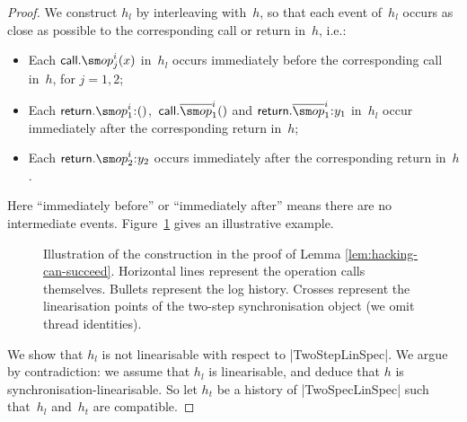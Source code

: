 \begin{proof}
We construct $h_l$ by interleaving with~$h$, so that each event of~$h_l$
occurs as close as possible to the corresponding call or return in~$h$, i.e.:
%
\begin{itemize}
\item Each $\call.\op_j^{i}(x)$ in~$h_l$ occurs immediately before the
  corresponding call in~$h$, for $j = 1,2$;

\item Each $\return.\op_1^i \:: ()$,\, $\call.\overline{\op}_1^i()$ and
  $\return.\overline{\op}_1^i \:: y_1$ in~$h_l$ occur immediately after the
  corresponding return in~$h$;

\item Each $\return.\op_2^i \:: y_2$ occurs immediately after the
  corresponding return in~$h$.
\end{itemize}
%
Here ``immediately before'' or ``immediately after'' means there are no
intermediate events.  Figure~\ref{fig:hacking-can-succeed} gives an
illustrative example. 


\begin{figure}[tp]
\begin{center}
\end{center}
\caption{Illustration of the construction in the proof of Lemma
  \ref{lem:hacking-can-succeed}.  Horizontal lines represent the operation
  calls themselves.  Bullets represent the log history.  Crosses represent
  the linearisation points of the two-step synchronisation object (we omit
  thread identities).}
\label{fig:hacking-can-succeed}
\end{figure}

We show that $h_l$ is not linearisable with respect to |TwoStepLinSpec|.  We
argue by contradiction: we assume that $h_l$ is linearisable, and deduce that
$h$ is synchronisation-linearisable.  So let $h_t$ be a history of
|TwoSpecLinSpec| such that~$h_l$ and~$h_t$ are compatible.  


\end{proof}
